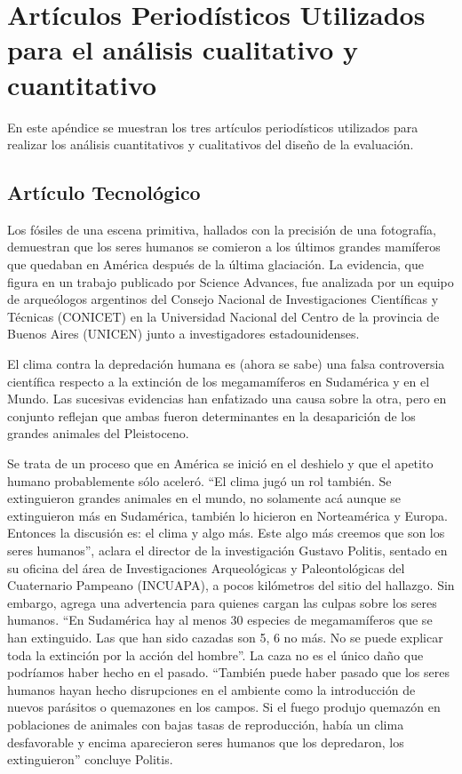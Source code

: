 \chapter{Artículos Periodísticos Utilizados para el análisis cualitativo y cuantitativo }
\label{sec:apendiceA}

En este apéndice se muestran los tres artículos periodísticos utilizados para realizar los análisis cuantitativos y cualitativos del diseño de la evaluación.

\section{Artículo Tecnológico}
\label{cap:sec:articulotecnologico}
Los fósiles de una escena primitiva, hallados con la precisión de una fotografía, demuestran que los seres humanos se comieron a los últimos grandes mamíferos que quedaban en América después de la última glaciación. La evidencia, que figura en un trabajo publicado por Science Advances, fue analizada por un equipo de arqueólogos argentinos del Consejo Nacional de Investigaciones Científicas y Técnicas (CONICET) en la Universidad Nacional del Centro de la provincia de Buenos Aires (UNICEN) junto a investigadores estadounidenses.

El clima contra la depredación humana es (ahora se sabe) una falsa controversia científica respecto a la extinción de los megamamíferos en Sudamérica y en el Mundo. Las sucesivas evidencias han enfatizado una causa sobre la otra, pero en conjunto reflejan que ambas fueron determinantes en la desaparición de los grandes animales del Pleistoceno.

Se trata de un proceso que en América se inició en el deshielo y que el apetito humano probablemente sólo aceleró. ``El clima jugó un rol también. Se extinguieron grandes animales en el mundo, no solamente acá aunque se extinguieron más en Sudamérica, también lo hicieron en Norteamérica y Europa. Entonces la discusión es: el clima y algo más. Este algo más creemos que son los seres humanos'', aclara el director de la investigación Gustavo Politis, sentado en su oficina del área de Investigaciones Arqueológicas y Paleontológicas del Cuaternario Pampeano (INCUAPA), a pocos kilómetros del sitio del hallazgo. Sin embargo, agrega una advertencia para quienes cargan las culpas sobre los seres humanos. ``En Sudamérica hay al menos 30 especies de megamamíferos que se han extinguido. Las que han sido cazadas son 5, 6 no más. No se puede explicar toda la extinción por la acción del hombre''. La caza no es el único daño que podríamos haber hecho en el pasado. ``También puede haber pasado que los seres humanos hayan hecho disrupciones en el ambiente como la introducción de nuevos parásitos o quemazones en los campos. Si el fuego produjo quemazón en poblaciones de animales con bajas tasas de reproducción, había un clima desfavorable y encima aparecieron seres humanos que los depredaron, los extinguieron'' concluye Politis.

